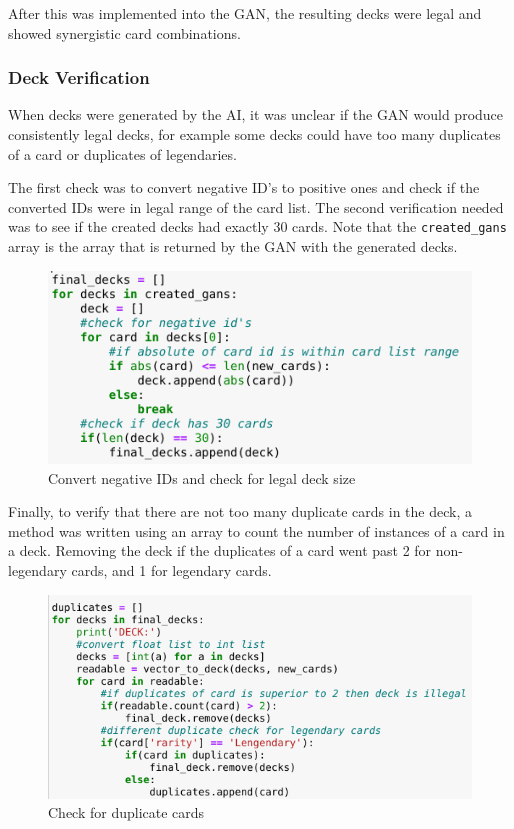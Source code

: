 \documentclass{report} %
\begin{document}
After this was implemented into the GAN, the resulting decks were legal and showed synergistic card combinations.

\subsubsection{Deck Verification}

When decks were generated by the AI, it was unclear if the GAN would produce consistently legal decks, for example some decks could have too many duplicates of a card or duplicates of legendaries.

The first check was to convert negative ID's to positive ones and check if the converted IDs were in legal range of the card list. The second verification needed was to see if the created decks had exactly 30 cards. Note that the \nolinkurl{created_gans} array is the array that is returned by the GAN with the generated decks.

\begin{figure}[H]
\centering
\includegraphics[width=1\textwidth]{abs}
\caption{Convert negative IDs and check for legal deck size \protect}
\label{board}
\end{figure}

Finally, to verify that there are not too many duplicate cards in the deck, a method was written using an array to count the number of instances of a card in a deck. Removing the deck if the duplicates of a card went past 2 for non-legendary cards, and 1 for legendary cards.

\begin{figure}[H]
\centering
\includegraphics[width=1\textwidth]{duplicates}
\caption{Check for duplicate cards \protect}
\label{board}
\end{figure}
\end{document}
